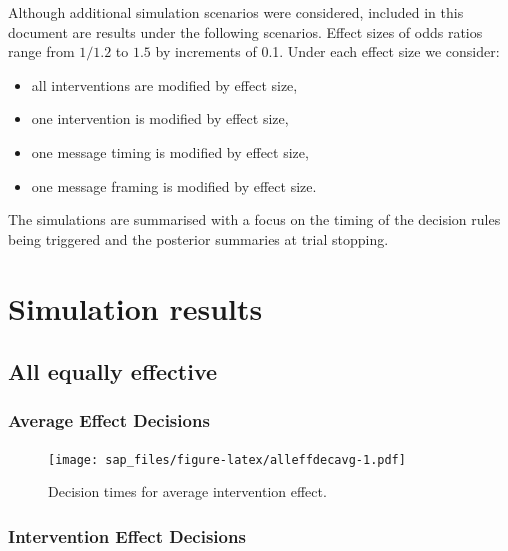 \documentclass[
  bibliography=totoc]{scrreprt}
\providecommand{\tightlist}{%
  \setlength{\itemsep}{0pt}\setlength{\parskip}{0pt}}
\begin{document}
Although additional simulation scenarios were considered, included in this document are results under the following scenarios.
Effect sizes of odds ratios range from \(1/1.2\) to \(1.5\) by increments of 0.1.
Under each effect size we consider:

\begin{itemize}
\tightlist
\item
  all interventions are modified by effect size,
\item
  one intervention is modified by effect size,
\item
  one message timing is modified by effect size,
\item
  one message framing is modified by effect size.
\end{itemize}

The simulations are summarised with a focus on the timing of the decision rules being triggered and the posterior summaries at trial stopping.

\clearpage

\hypertarget{simulation-results}{%
\section{Simulation results}\label{simulation-results}}

\hypertarget{all-equally-effective}{%
\subsection{All equally effective}\label{all-equally-effective}}

\hypertarget{average-effect-decisions}{%
\subsubsection{Average Effect Decisions}\label{average-effect-decisions}}

\begin{figure}
\centering
\texttt{[image: sap\_files/figure-latex/alleffdecavg-1.pdf]}
\caption{\label{fig:alleffdecavg}Decision times for average intervention effect.}
\end{figure}

\clearpage

\hypertarget{intervention-effect-decisions}{%
\subsubsection{Intervention Effect Decisions}\label{intervention-effect-decisions}}
\end{document}
